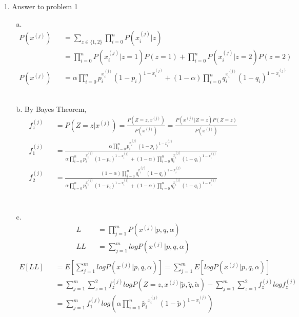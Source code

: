 \begin{enumerate}
\item[1.] Answer to problem 1
	\begin{enumerate}
	\item[a.]
	\begin{eqnarray}
		P(x^{(j)}) && = \sum_{z \in \{1,2\}} \prod_{i = 0}^{n} P(x_{i}^{(j)}|z)\\
		&& = \prod_{i = 0}^{n} P(x_{i}^{(j)}|z=1)P(z=1) + \prod_{i = 0}^{n} P(x_{i}^{(j)}|z=2)P(z=2)\\
		P(x^{(j)}) && = \alpha \prod_{i = 0}^{n} p_i^{x_{i}^{(j)}} (1-p_i)^{1-x_i^{(j)}} + (1 - \alpha) \prod_{i = 0}^{n} q_i^{x_{i}^{(j)}} (1-q_i)^{1-x_i^{(j)}}
	\end{eqnarray}\\
	\item[b.] By Bayes Theorem,
	\begin{eqnarray}
		f_z^{(j)} && = P(Z = z | x^{(j)}) = \frac{P(Z = z, x^{(j)})}{P(x^{(j)})} = \frac{P(x^{(j)}|Z=z) P(Z=z)}{P(x^{(j)})}\\
		f_1^{(j)} && = \frac{\alpha \prod_{i = 0}^{n} p_i^{x_{i}^{(j)}} (1-p_i)^{1-x_i^{(j)}}}{\alpha \prod_{i = 0}^{n} p_i^{x_{i}^{(j)}} (1-p_i)^{1-x_i^{(j)}} + (1 - \alpha) \prod_{i = 0}^{n} q_i^{x_{i}^{(j)}} (1-q_i)^{1-x_i^{(j)}}}\\
		f_2^{(j)} && = \frac{(1 - \alpha) \prod_{i = 0}^{n} q_i^{x_{i}^{(j)}} (1-q_i)^{1-x_i^{(j)}}}{\alpha \prod_{i = 0}^{n} p_i^{x_{i}^{(j)}} (1-p_i)^{1-x_i^{(j)}} + (1 - \alpha) \prod_{i = 0}^{n} q_i^{x_{i}^{(j)}} (1-q_i)^{1-x_i^{(j)}}}\\
	\end{eqnarray}\\
	\item[c.]
	\begin{eqnarray}
		L && = \prod_{j=1}^{m} P(x^{(j)}|p,q,\alpha)\\
		LL && = \sum_{j=1}^{m} log P(x^{(j)}|p,q,\alpha)\\
	\end{eqnarray}
	\begin{eqnarray}
		E[LL] && = E[\sum_{j=1}^{m} log P(x^{(j)}|p,q,\alpha)] = \sum_{j=1}^{m} E[log P(x^{(j)}|p,q,\alpha)]\\
		&& = \sum_{j=1}^{m} \sum_{z=1}^{2} f_z^{(j)} log P(Z = z, x^{(j)}| \tilde{p}, \tilde{q}, \tilde{\alpha}) - \sum_{j=1}^{m} \sum_{z=1}^{2} f_z^{(j)} log f_z^{(j)}\\
		&& = \sum_{j=1}^{m} f_1^{(j)} log(\alpha \prod_{i=1}^{n} \tilde{p_i}^{x_i^{(j)}} (1- \tilde{p})^{1-x_i^{(j)}})\\

\end{eqnarray}
\end{enumerate}
\end{enumerate}
